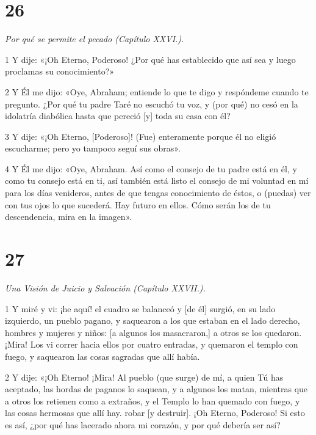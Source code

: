\chapter{26}

\par \textit{Por qué se permite el pecado (Capítulo XXVI.).}

\par 1 Y dije: «¡Oh Eterno, Poderoso! ¿Por qué has establecido que así sea y luego proclamas su conocimiento?»

\par 2 Y Él me dijo: «Oye, Abraham; entiende lo que te digo y respóndeme cuando te pregunto. ¿Por qué tu padre Taré no escuchó tu voz, y (por qué) no cesó en la idolatría diabólica hasta que pereció [y] toda su casa con él?

\par 3 Y dije: «¡Oh Eterno, [Poderoso]! (Fue) enteramente porque él no eligió escucharme; pero yo tampoco seguí sus obras».

\par 4 Y Él me dijo: «Oye, Abraham. Así como el consejo de tu padre está en él, y como tu consejo está en ti, así también está listo el consejo de mi voluntad en mí para los días venideros, antes de que tengas conocimiento de éstos, o (puedas) ver con tus ojos lo que sucederá. Hay futuro en ellos. Cómo serán los de tu descendencia, mira en la imagen».

\chapter{27}

\par \textit{Una Visión de Juicio y Salvación (Capítulo XXVII.).}

\par 1 Y miré y vi: ¡he aquí! el cuadro se balanceó y [de él] surgió, en su lado izquierdo, un pueblo pagano, y saquearon a los que estaban en el lado derecho, hombres y mujeres y niños: [a algunos los masacraron,] a otros se los quedaron. ¡Mira! Los vi correr hacia ellos por cuatro entradas, y quemaron el templo con fuego, y saquearon las cosas sagradas que allí había.

\par 2 Y dije: «¡Oh Eterno! ¡Mira! Al pueblo (que surge) de mí, a quien Tú has aceptado, las hordas de paganos lo saquean, y a algunos los matan, mientras que a otros los retienen como a extraños, y el Templo lo han quemado con fuego, y las cosas hermosas que allí hay. robar [y destruir]. ¡Oh Eterno, Poderoso! Si esto es así, ¿por qué has lacerado ahora mi corazón, y por qué debería ser así?


